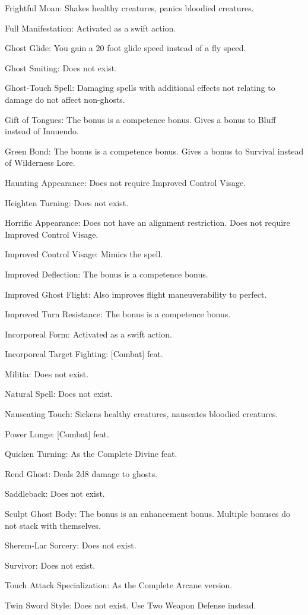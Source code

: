 \begin{itemize*}
\item Frightful Moan: Shakes healthy creatures, panics bloodied creatures.
\item Full Manifestation: Activated as a swift action.
\item Ghost Glide: You gain a 20 foot glide speed instead of a fly speed.
\item Ghost Smiting: Does not exist.
\item Ghost-Touch Spell: Damaging spells with additional effects not relating to damage do not affect non-ghosts.
\item Gift of Tongues: The bonus is a competence bonus. Gives a bonus to Bluff instead of Innuendo.
\item Green Bond: The bonus is a competence bonus. Gives a bonus to Survival instead of Wilderness Lore.
\item Haunting Appearance: Does not require Improved Control Visage.
\item Heighten Turning: Does not exist.
\item Horrific Appearance: Does not have an alignment restriction. Does not require Improved Control Visage.
\item Improved Control Visage: Mimics the  spell.
\item Improved Deflection: The bonus is a competence bonus.
\item Improved Ghost Flight: Also improves flight maneuverability to perfect.
\item Improved Turn Resistance: The bonus is a competence bonus.
\item Incorporeal Form: Activated as a swift action.
\item Incorporeal Target Fighting: [Combat] feat.
\item Militia: Does not exist.
\item Natural Spell: Does not exist.
\item Nauseating Touch: Sickens healthy creatures, nauseates bloodied creatures.
\item Power Lunge: [Combat] feat.
\item Quicken Turning: As the Complete Divine feat.
\item Rend Ghost: Deals 2d8 damage to ghosts.
\item Saddleback: Does not exist.
\item Sculpt Ghost Body: The bonus is an enhancement bonus. Multiple bonuses do not stack with themselves.
\item Sherem-Lar Sorcery: Does not exist.
\item Survivor: Does not exist.
\item Touch Attack Specialization: As the Complete Arcane version.
\item Twin Sword Style: Does not exist. Use Two Weapon Defense instead.
\end{itemize*}

